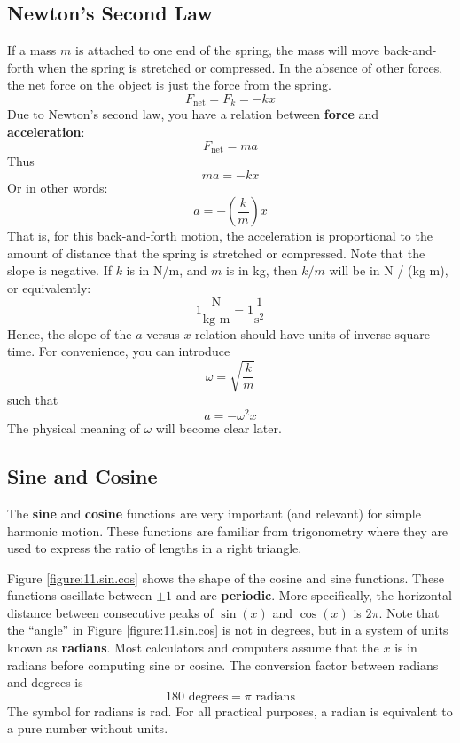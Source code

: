 \subsection{Newton's Second Law}
%
If a mass $m$ is attached to one end of the spring, the mass will move back-and-forth when the spring is stretched or compressed. In the absence of other forces, the net force on the object is just the force from the spring.
\begin{equation}
    F_{\text{net}} = F_{k} = -kx
\end{equation}
Due to Newton's second law, you have a relation between \textbf{force} and \textbf{acceleration}:
\begin{equation}
    F_{\text{net}} = m a
\end{equation}
Thus
\begin{equation}
    ma = -kx
\end{equation}
Or in other words:
\begin{equation}
    a = -\left( \frac{k}{m} \right) x
    \label{eq.11.ax}
\end{equation}
That is, for this back-and-forth motion, the acceleration is proportional to the amount of distance that the spring is stretched or compressed. Note that the slope is negative. If $k$ is in N/m, and $m$ is in kg, then $k/m$ will be in N / (kg m), or equivalently:
\begin{equation}
    1 \frac{\text{N}}{\text{kg m}} = 1 \frac{1}{\text{s}^{2}}
\end{equation}
Hence, the slope of the $a$ versus $x$ relation should have units of inverse square time. For convenience, you can introduce
\begin{equation}
    \omega = \sqrt{\frac{k}{m}}
\end{equation}
such that
\begin{equation}
    a = - \omega^{2} x
    \label{eq:11.axomega}
\end{equation}
The physical meaning of $\omega$ will become clear later.
%
\subsection{Sine and Cosine}
%
The \textbf{sine} and \textbf{cosine} functions are very important (and relevant) for simple harmonic motion. These functions are familiar from trigonometry where they are used to express the ratio of lengths in a right triangle.

Figure \ref{figure:11.sin.cos} shows the shape of the cosine and sine functions. These functions oscillate between $\pm 1$ and are \textbf{periodic}. More specifically, the horizontal distance between consecutive peaks of $\sin(x)$ and $\cos(x)$ is $2\pi$. Note that the ``angle'' in Figure \ref{figure:11.sin.cos} is not in degrees, but in a system of units known as \textbf{radians}. Most calculators and computers assume that the $x$ is in radians before computing sine or cosine. The conversion factor between radians and degrees is
\begin{equation}
    180 \text{ degrees} = \pi \text{ radians}
\end{equation}
The symbol for radians is rad. For all practical purposes, a radian is equivalent to a pure number without units.
%
